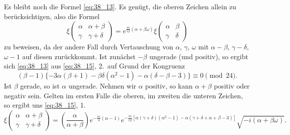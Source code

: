 \documentclass[12pt,a4paper]{article}
\begin{document}
Es bleibt noch die Formel \eqref{eq:38_13}. Es gen\"ugt, die oberen Zeichen allein zu ber\"ucksichtigen, also die Formel
\[
\xi\begin{pmatrix}\alpha&\alpha+\beta\\\gamma&\gamma+\delta\end{pmatrix}
= e^{\frac{\pi i}{12}(\alpha+\beta\omega)}\xi\begin{pmatrix}\alpha&\beta\\\gamma&\delta\end{pmatrix}
\]
zu beweisen, da der andere Fall durch Vertauschung von $\alpha$, $\gamma$, $\omega$ mit $\alpha-\beta$, $\gamma-\delta$, $\omega-1$ auf diesen zur\"uckkommt. Ist zun\"achst $-\beta$ ungerade (und positiv), so ergibt sich \eqref{eq:38_13} aus \eqref{eq:38_15}, 2.\ auf Grund der Kongruenz
\[
(\beta-1)\{-3\alpha(\beta+1)-\beta\delta(\alpha^2-1)-\alpha(\delta-\beta-3)\} \equiv 0\pmod{24}.
\]
Ist $\beta$ gerade, so ist $\alpha$ ungerade. Nehmen wir $\alpha$ positiv, so kann $\alpha+\beta$ positiv oder negativ sein. Gelten im ersten Falle die oberen, im zweiten die unteren Zeichen, so ergibt uns \eqref{eq:38_15}, 1.
\begin{equation}\label{eq:38_16}
\xi\begin{pmatrix}\alpha&\alpha+\beta\\\gamma&\gamma+\delta\end{pmatrix}
= \left(\frac{\alpha}{\alpha+\beta}\right)e^{-\frac{\pi i}{4}(\alpha-1)}e^{-\frac{\pi i}{12}[\alpha(\gamma+\delta)(\alpha^2-1)-\alpha(\gamma+\delta+\alpha+\beta-3)]}\sqrt{-i(\alpha+\beta\omega)}.
\end{equation}
\end{document}
